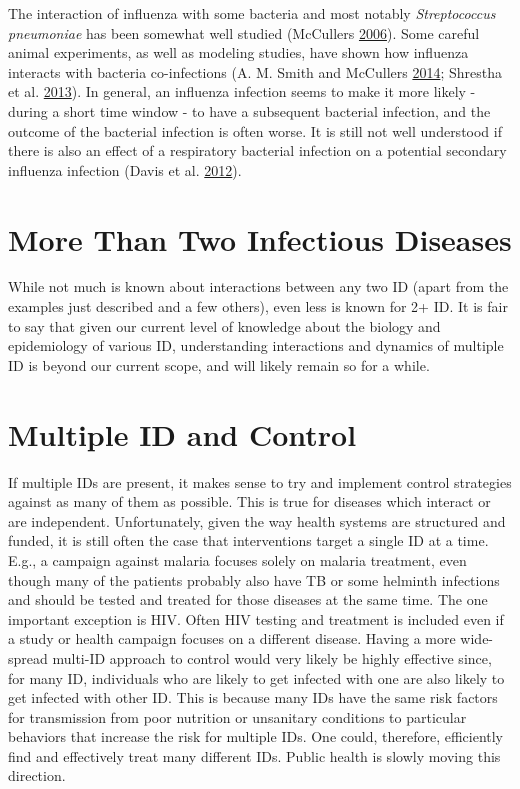 \documentclass[
]{book}
\begin{document}
The interaction of influenza with some bacteria and most notably \emph{Streptococcus pneumoniae} has been somewhat well studied (McCullers \protect\hyperlink{ref-mccullers06}{2006}). Some careful animal experiments, as well as modeling studies, have shown how influenza interacts with bacteria co-infections (A. M. Smith and McCullers \protect\hyperlink{ref-smith14a}{2014}; Shrestha et al. \protect\hyperlink{ref-shrestha13}{2013}). In general, an influenza infection seems to make it more likely - during a short time window - to have a subsequent bacterial infection, and the outcome of the bacterial infection is often worse. It is still not well understood if there is also an effect of a respiratory bacterial infection on a potential secondary influenza infection (Davis et al. \protect\hyperlink{ref-davis12}{2012}).

\hypertarget{more-than-two-infectious-diseases}{%
\section{More Than Two Infectious Diseases}\label{more-than-two-infectious-diseases}}

While not much is known about interactions between any two ID (apart from the examples just described and a few others), even less is known for 2+ ID. It is fair to say that given our current level of knowledge about the biology and epidemiology of various ID, understanding interactions and dynamics of multiple ID is beyond our current scope, and will likely remain so for a while.

\hypertarget{multiple-id-and-control}{%
\section{Multiple ID and Control}\label{multiple-id-and-control}}

If multiple IDs are present, it makes sense to try and implement control strategies against as many of them as possible. This is true for diseases which interact or are independent. Unfortunately, given the way health systems are structured and funded, it is still often the case that interventions target a single ID at a time. E.g., a campaign against malaria focuses solely on malaria treatment, even though many of the patients probably also have TB or some helminth infections and should be tested and treated for those diseases at the same time. The one important exception is HIV. Often HIV testing and treatment is included even if a study or health campaign focuses on a different disease. Having a more wide-spread multi-ID approach to control would very likely be highly effective since, for many ID, individuals who are likely to get infected with one are also likely to get infected with other ID. This is because many IDs have the same risk factors for transmission from poor nutrition or unsanitary conditions to particular behaviors that increase the risk for multiple IDs. One could, therefore, efficiently find and effectively treat many different IDs. Public health is slowly moving this direction.
\end{document}
